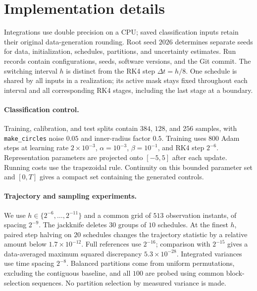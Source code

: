 \section{Implementation details}\label{sec:numerical_details}

Integrations use double precision on a CPU; saved classification inputs retain their original data-generation rounding. Root seed $2026$ determines separate seeds for data, initialization, schedules, partitions, and uncertainty estimates. Run records contain configurations, seeds, software versions, and the Git commit. The switching interval $h$ is distinct from the RK4 step $\Delta t=h/8$. One schedule is shared by all inputs in a realization; its active mask stays fixed throughout each interval and all corresponding RK4 stages, including the last stage at a boundary.

\paragraph{Classification control.}
Training, calibration, and test splits contain $384$, $128$, and $256$ samples, with \texttt{make\_circles} noise $0.05$ and inner-radius factor $0.5$. Training uses $800$ Adam steps at learning rate $2\times10^{-3}$, $\alpha=10^{-3}$, $\beta=10^{-1}$, and RK4 step $2^{-6}$. Representation parameters are projected onto $[-5,5]$ after each update. Running costs use the trapezoidal rule. Continuity on this bounded parameter set and $[0,T]$ gives a compact set containing the generated controls.

\paragraph{Trajectory and sampling experiments.}
We use $h\in\{2^{-6},\ldots,2^{-11}\}$ and a common grid of $513$ observation instants, of spacing $2^{-9}$. The jackknife deletes $30$ groups of $10$ schedules. At the finest $h$, paired step halving on $20$ schedules changes the trajectory statistic by a relative amount below $1.7\times10^{-12}$. Full references use $2^{-16}$; comparison with $2^{-15}$ gives a data-averaged maximum squared discrepancy $5.3\times10^{-28}$. Integrated variances use time spacing $2^{-8}$. Balanced partitions come from uniform permutations, excluding the contiguous baseline, and all $100$ are probed using common block-selection sequences. No partition selection by measured variance is made.

